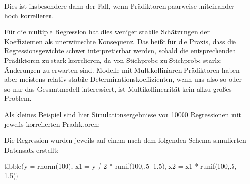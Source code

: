 \documentclass[
]{book}
\newenvironment{Shaded}{\begin{snugshade}}{\end{snugshade}}
\newcommand{\AttributeTok}[1]{\textcolor[rgb]{0.77,0.63,0.00}{#1}}
\newcommand{\DecValTok}[1]{\textcolor[rgb]{0.00,0.00,0.81}{#1}}
\newcommand{\FloatTok}[1]{\textcolor[rgb]{0.00,0.00,0.81}{#1}}
\newcommand{\FunctionTok}[1]{\textcolor[rgb]{0.00,0.00,0.00}{#1}}
\newcommand{\NormalTok}[1]{#1}
\newcommand{\SpecialCharTok}[1]{\textcolor[rgb]{0.00,0.00,0.00}{#1}}
\begin{document}
Dies ist insbesondere dann der Fall, wenn Prädiktoren paarweise
miteinander hoch korrelieren.

Für die multiple Regression hat dies weniger stabile Schätzungen der Koeffizienten als unerwünschte Konsequenz. Das heißt für die Praxis, dass die Regressionsgewichte schwer interpretierbar werden, sobald die entsprechenden Prädiktoren zu stark korrelieren, da von Stichprobe zu Stichprobe starke Änderungen zu erwarten sind. Modelle mit Multikolliniaren Prädiktoren haben aber meistens relativ stabile Determinationskoeffizienten, wenn uns also so oder so nur das Gesamtmodell interessiert, ist Multikollinearität kein allzu großes Problem.

Als kleines Beispiel sind hier Simulationsergebnisse von 10000 Regressionen mit jeweils korrelierten Prädiktoren:

Die Regression wurden jeweils auf einem nach dem folgenden Schema simulierten Datensatz erstellt:

\begin{Shaded}
\begin{Highlighting}[]
\FunctionTok{tibble}\NormalTok{(}\AttributeTok{y =} \FunctionTok{rnorm}\NormalTok{(}\DecValTok{100}\NormalTok{),}
       \AttributeTok{x1 =}\NormalTok{ y }\SpecialCharTok{/} \DecValTok{2} \SpecialCharTok{*} \FunctionTok{runif}\NormalTok{(}\DecValTok{100}\NormalTok{,.}\DecValTok{5}\NormalTok{, }\FloatTok{1.5}\NormalTok{),}
       \AttributeTok{x2 =}\NormalTok{ x1 }\SpecialCharTok{*} \FunctionTok{runif}\NormalTok{(}\DecValTok{100}\NormalTok{,.}\DecValTok{5}\NormalTok{, }\FloatTok{1.5}\NormalTok{)) }
\end{Highlighting}
\end{Shaded}

 
  \providecommand{\huxb}[2]{\arrayrulecolor[RGB]{#1}\global\arrayrulewidth=#2pt}
  \providecommand{\huxvb}[2]{\color[RGB]{#1}\vrule width #2pt}
  \providecommand{\huxtpad}[1]{\rule{0pt}{#1}}
  \providecommand{\huxbpad}[1]{\rule[-#1]{0pt}{#1}}
\end{document}
